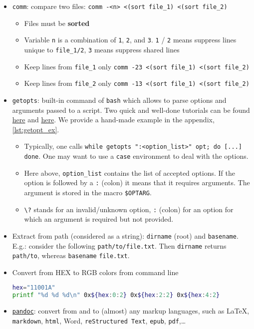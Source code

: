 \documentclass[a4paper,12pt,%
              final%
              ]{article}
\begin{document}
\begin{itemize}
\begin{itemize}
    \end{itemize}
  \item \texttt{comm}: compare two files: \verb|comm -<n> <(sort file_1) <(sort file_2)|
    \begin{itemize}
      \item Files must be \textbf{sorted}
      \item Variable \texttt{n} is a combination of \texttt{1}, \texttt{2}, and \texttt{3}. \texttt{1} / \texttt{2} means suppress lines unique to \verb|file_1/2|, \texttt{3} means suppress shared lines
      \item Keep lines from \verb|file_1| only \verb|comm -23 <(sort file_1) <(sort file_2)|
      \item Keep lines from \verb|file_2| only \verb|comm -13 <(sort file_1) <(sort file_2)|
    \end{itemize}
  \item \texttt{getopts}: built-in command of \texttt{bash} which allows to parse options and arguments passed to a script. Two quick and well-done tutorials can be found \href{https://www.computerhope.com/unix/bash/getopts.htm}{here} and \href{https://sookocheff.com/post/bash/parsing-bash-script-arguments-with-shopts/}{here}. We provide a hand-made example in the appendix, \autoref{lst:getopt_ex}.
    \begin{itemize}
      \item Typically, one calls \verb|while getopts ":<option_list>" opt; do [...] done|. One may want to use a \verb|case| environment to deal with the options.
      \item Here above, \verb|option_list| contains the list of accepted options. If the option is followed by a \verb|:| (colon) it means that it requires arguments. The argument is stored in the macro \verb|$OPTARG|.
      \item \verb|\?| stands for an invalid/unknown option, \verb|:| (colon) for an option for which an argument is required but not provided.
    \end{itemize}
  \item Extract from path (considered as a string): \texttt{dirname} (root) and \texttt{basename}. E.g.: consider the following \texttt{path/to/file.txt}. Then \texttt{dirname} returns \texttt{path/to}, whereas \texttt{basename} \texttt{file.txt}.
  \item Convert from HEX to RGB colors from command line
\begin{lstlisting}[language=bash]
hex="11001A"
printf "%d %d %d\n" 0x${hex:0:2} 0x${hex:2:2} 0x${hex:4:2}
\end{lstlisting}
  \item \href{https://pandoc.org/}{\texttt{pandoc}}: convert from and to (almost) any markup languages, such as \LaTeX{}, \texttt{markdown}, \texttt{html}, Word, \texttt{reStructured Text}, \texttt{epub}, \texttt{pdf},\ldots
\end{itemize}
\end{document}
